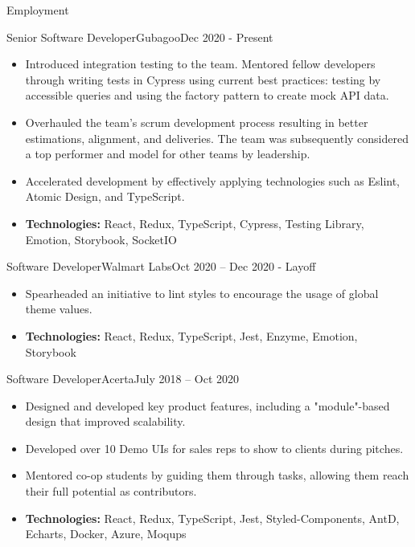 \documentclass[]{mcdowellcv}
\begin{document}
	\begin{cvsection}{Employment}
		\begin{cvsubsection}{Senior Software Developer}{Gubagoo}{Dec 2020 - Present}
 			\begin{itemize}
 			    \item Introduced integration testing to the team. Mentored fellow developers through writing tests in Cypress using current best practices: testing by accessible queries and using the factory pattern to create mock API data.
				\item Overhauled the team's scrum development process resulting in better estimations, alignment, and deliveries. The team was subsequently considered a top performer and model for other teams by leadership.
				\item Accelerated development by effectively applying technologies such as Eslint, Atomic Design, and TypeScript.
				\item \textbf{Technologies:} React, Redux, TypeScript, Cypress, Testing Library, Emotion, Storybook, SocketIO
			\end{itemize}
		\end{cvsubsection}
		\begin{cvsubsection}{Software Developer}{Walmart Labs}{Oct 2020 -- Dec 2020 - Layoff}
			\begin{itemize}
				\item Spearheaded an initiative to lint styles to encourage the usage of global theme values.
				\item \textbf{Technologies:} React, Redux, TypeScript, Jest, Enzyme, Emotion, Storybook
			\end{itemize}
		\end{cvsubsection}
		\begin{cvsubsection}{Software Developer}{Acerta}{July 2018 -- Oct 2020}
			\begin{itemize}
				\item Designed and developed key product features, including a "module"-based design that improved scalability.
				\item Developed over 10 Demo UIs for sales reps to show to clients during pitches.
				\item Mentored co-op students by guiding them through tasks, allowing them reach their full potential as contributors.
				\item \textbf{Technologies:} React, Redux, TypeScript, Jest, Styled-Components, AntD, Echarts, Docker, Azure, Moqups
			\end{itemize}
		\end{cvsubsection}


\end{cvsection}
\end{document}
